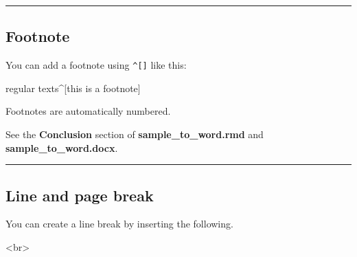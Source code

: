 \documentclass[
  letterpaper,
  DIV=11,
  numbers=noendperiod]{scrreprt}
\newenvironment{Shaded}{\begin{snugshade}}{\end{snugshade}}
\newcommand{\KeywordTok}[1]{\textcolor[rgb]{0.00,0.23,0.31}{#1}}
\newcommand{\NormalTok}[1]{\textcolor[rgb]{0.00,0.23,0.31}{#1}}
\newcommand{\SpecialCharTok}[1]{\textcolor[rgb]{0.37,0.37,0.37}{#1}}
\begin{document}
\begin{center}\rule{0.5\linewidth}{0.5pt}\end{center}

\hypertarget{footnote}{%
\subsection{Footnote}\label{footnote}}

You can add a footnote using \texttt{\^{}{[}{]}} like this:

\begin{Shaded}
\begin{Highlighting}[]
\NormalTok{regular texts}\SpecialCharTok{\^{}}\NormalTok{[this is a footnote]}
\end{Highlighting}
\end{Shaded}

Footnotes are automatically numbered.

\begin{tcolorbox}[enhanced jigsaw, colframe=quarto-callout-note-color-frame, toptitle=1mm, colbacktitle=quarto-callout-note-color!10!white, toprule=.15mm, colback=white, arc=.35mm, bottomtitle=1mm, opacitybacktitle=0.6, breakable, left=2mm, coltitle=black, leftrule=.75mm, title=\textcolor{quarto-callout-note-color}{\faInfo}\hspace{0.5em}{Note}, rightrule=.15mm, titlerule=0mm, opacityback=0, bottomrule=.15mm]

See the \textbf{Conclusion} section of \textbf{sample\_to\_word.rmd} and
\textbf{sample\_to\_word.docx}.

\end{tcolorbox}

\begin{center}\rule{0.5\linewidth}{0.5pt}\end{center}

\hypertarget{line-and-page-break}{%
\subsection{Line and page break}\label{line-and-page-break}}

You can create a line break by inserting the following.

\begin{Shaded}
\begin{Highlighting}[]
\KeywordTok{\textless{}br\textgreater{}}
\end{Highlighting}
\end{Shaded}
\end{document}
